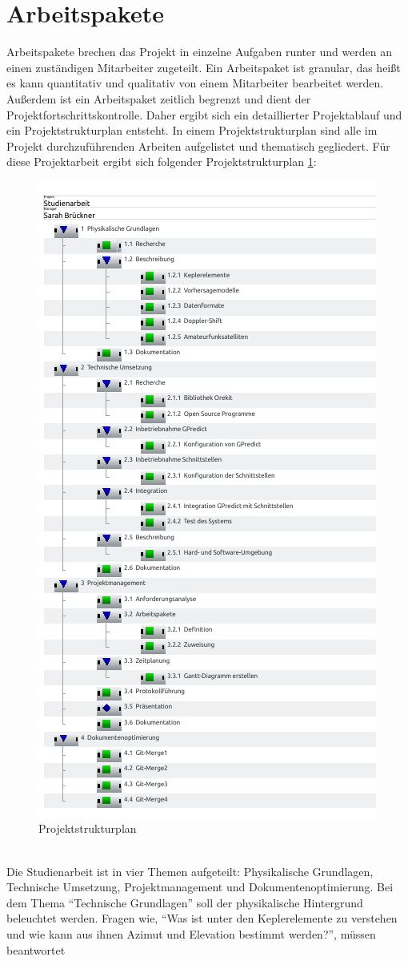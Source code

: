 \section{Arbeitspakete}
Arbeitspakete brechen das Projekt in einzelne Aufgaben runter und werden an einen 
zuständigen Mitarbeiter zugeteilt. Ein Arbeitspaket ist granular, das heißt es kann quantitativ und 
qualitativ von einem Mitarbeiter bearbeitet werden. Außerdem ist ein Arbeitspaket zeitlich begrenzt 
und dient der Projektfortschrittskontrolle. 
Daher ergibt sich ein detaillierter Projektablauf und ein Projektstrukturplan entsteht. In einem 
Projektstrukturplan sind alle im Projekt durchzuführenden Arbeiten aufgelistet und thematisch 
gegliedert. Für diese Projektarbeit ergibt sich folgender Projektstrukturplan 
\ref{fig:projektstruktur}:\\
\begin{figure}[h]
 \centering
\includegraphics[width=0.5\linewidth]{./images/00tasks}
\caption{Projektstrukturplan}
 \label{fig:projektstruktur}
\end{figure}
\\
Die Studienarbeit ist in vier Themen aufgeteilt: Physikalische Grundlagen, Technische Umsetzung, 
Projektmanagement und Dokumentenoptimierung. Bei dem Thema ``Technische Grundlagen'' soll der 
physikalische Hintergrund beleuchtet werden. Fragen wie, ``Was ist unter den Keplerelemente zu 
verstehen und wie kann aus ihnen Azimut und Elevation bestimmt werden?'', müssen beantwortet 
